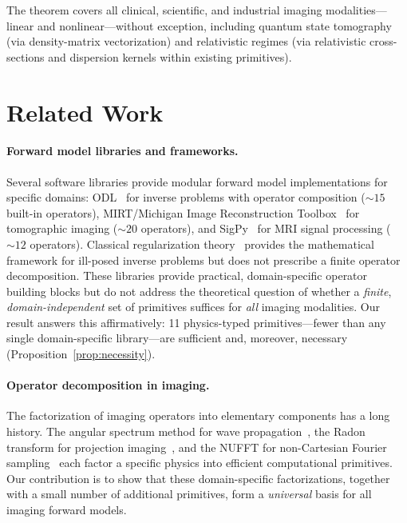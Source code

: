 \documentclass[11pt]{article}
\begin{document}
The theorem covers all clinical, scientific, and industrial imaging modalities---linear and nonlinear---without exception, including quantum state tomography (via density-matrix vectorization) and relativistic regimes (via relativistic cross-sections and dispersion kernels within existing primitives).


\section{Related Work}
\label{sec:related}

\paragraph{Forward model libraries and frameworks.}
Several software libraries provide modular forward model implementations for specific domains: ODL~\cite{adler2017odl} for inverse problems with operator composition (${\sim}15$ built-in operators), MIRT/Michigan Image Reconstruction Toolbox~\cite{fessler2003mirt} for tomographic imaging (${\sim}20$ operators), and SigPy~\cite{ong2019sigpy} for MRI signal processing (${\sim}12$ operators). Classical regularization theory~\cite{engl1996regularization} provides the mathematical framework for ill-posed inverse problems but does not prescribe a finite operator decomposition. These libraries provide practical, domain-specific operator building blocks but do not address the theoretical question of whether a \emph{finite}, \emph{domain-independent} set of primitives suffices for \emph{all} imaging modalities. Our result answers this affirmatively: 11 physics-typed primitives---fewer than any single domain-specific library---are sufficient and, moreover, necessary (Proposition~\ref{prop:necessity}).

\paragraph{Operator decomposition in imaging.}
The factorization of imaging operators into elementary components has a long history. The angular spectrum method for wave propagation~\cite{goodman2005fourier}, the Radon transform for projection imaging~\cite{natterer2001radon}, and the NUFFT for non-Cartesian Fourier sampling~\cite{fessler2003nufft} each factor a specific physics into efficient computational primitives. Our contribution is to show that these domain-specific factorizations, together with a small number of additional primitives, form a \emph{universal} basis for all imaging forward models.
\end{document}
